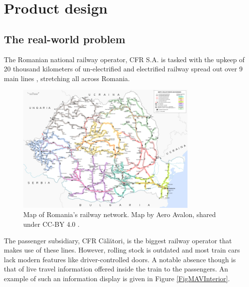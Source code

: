 \chapter{Product design}

\section{The real-world problem}
The Romanian national railway operator, CFR S.A. is tasked with the upkeep of 20 thousand kilometers of un-electrified and electrified railway spread out over 9 main lines \cite{CFROrdinMagistrale} \cite{WallstreetRoReorganizareSNCFR}, stretching all across Romania.

\begin{figure}[htbp]
    \centering
    \includegraphics[width=0.8\textwidth]{./figures/ch3_romania-feroviara.png}
    \caption{Map of Romania's railway network. Map by Aero Avalon, shared under CC-BY 4.0 \cite{WikipediaRomaniaFeroviara}.}
    \label{FigRomaniaFeroviara}
\end{figure}

The passenger subsidiary, CFR Călători, is the biggest railway operator that makes use of these lines. However, rolling stock is outdated and most train cars lack modern features like driver-controlled doors. A notable absence though is that of live travel information offered inside the train to the passengers. An example of such an information display is given in Figure \ref{FigMAVInterior}.


